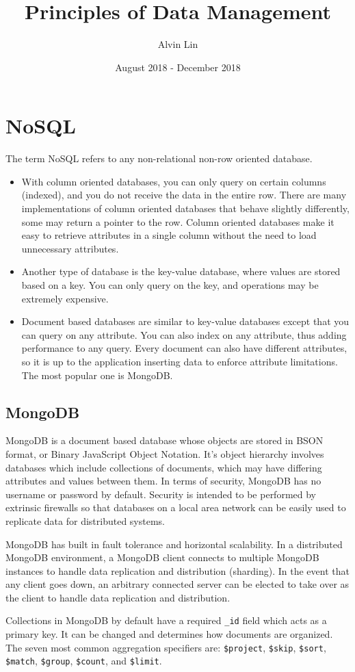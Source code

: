 \documentclass{math}
\title{Principles of Data Management}
\author{Alvin Lin}
\date{August 2018 - December 2018}
\begin{document}
\lstset{basicstyle=\ttfamily\footnotesize,breaklines=true}
\maketitle

\section*{NoSQL}
The term NoSQL refers to any non-relational non-row oriented database.
\begin{itemize}
  \item With column oriented databases, you can only query on certain columns
    (indexed), and you do not receive the data in the entire row. There are
    many implementations of column oriented databases that behave slightly
    differently, some may return a pointer to the row. Column oriented
    databases make it easy to retrieve attributes in a single column without
    the need to load unnecessary attributes.
  \item Another type of database is the key-value database, where values are
    stored based on a key. You can only query on the key, and operations may
    be extremely expensive.
  \item Document based databases are similar to key-value databases except
    that you can query on any attribute. You can also index on any attribute,
    thus adding performance to any query. Every document can also have different
    attributes, so it is up to the application inserting data to enforce
    attribute limitations. The most popular one is MongoDB.
\end{itemize}

\subsection*{MongoDB}
MongoDB is a document based database whose objects are stored in BSON format,
or Binary JavaScript Object Notation. It's object hierarchy involves databases
which include collections of documents, which may have differing attributes
and values between them. In terms of security, MongoDB has no username or
password by default. Security is intended to be performed by extrinsic firewalls
so that databases on a local area network can be easily used to replicate data
for distributed systems. \par
MongoDB has built in fault tolerance and horizontal scalability. In a
distributed MongoDB environment, a MongoDB client connects to multiple MongoDB
instances to handle data replication and distribution (sharding). In the event
that any client goes down, an arbitrary connected server can be elected to take
over as the client to handle data replication and distribution. \par
Collections in MongoDB by default have a required \texttt{\_id} field which acts
as a primary key. It can be changed and determines how documents are organized.
The seven most common aggregation specifiers are: \texttt{\$project},
\texttt{\$skip}, \texttt{\$sort}, \texttt{\$match}, \texttt{\$group},
\texttt{\$count}, and \texttt{\$limit}.
\end{document}
